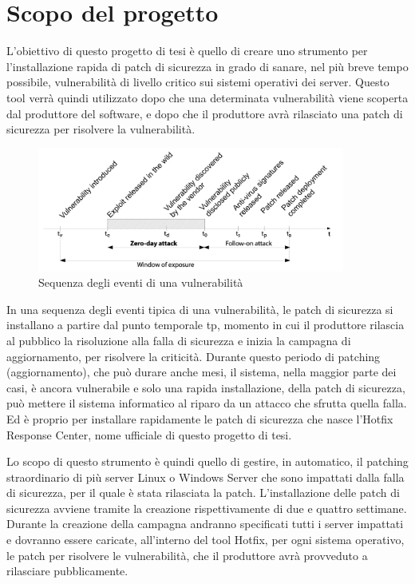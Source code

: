 %
%
\section{Scopo del progetto}
L'obiettivo di questo progetto di tesi è quello di creare uno strumento 
per l'installazione rapida di patch di sicurezza in grado di sanare, 
nel più breve tempo possibile, vulnerabilità di livello critico sui 
sistemi operativi dei server.
Questo tool verrà quindi utilizzato dopo che una determinata 
vulnerabilità viene scoperta dal produttore del software, e dopo che 
il produttore avrà rilasciato una patch di sicurezza per risolvere la 
vulnerabilità.
\begin{figure}[H]
  \begin{flushright}
    \centering
    \includegraphics[width=0.90\textwidth]{imgs/vulnerability_windows.png}
    \caption{Sequenza degli eventi di una vulnerabilità}
    \label{fig:Sequenza degli eventi di una vulnerabilità}
  \end{flushright}
\end{figure}
In una sequenza degli eventi tipica di una vulnerabilità, le patch di 
sicurezza si installano a partire dal punto temporale tp, momento in cui 
il produttore rilascia al pubblico la risoluzione alla falla di sicurezza 
e inizia la campagna di aggiornamento, per risolvere la criticità. 
Durante questo periodo di patching (aggiornamento), che può durare anche 
mesi, il sistema, nella maggior parte dei casi, è ancora vulnerabile e 
solo una rapida installazione, della patch di sicurezza, può mettere il 
sistema informatico al riparo da un attacco che sfrutta quella falla.
Ed è proprio per installare rapidamente le patch di sicurezza che nasce 
l’Hotfix Response Center, nome ufficiale di questo progetto di tesi.

Lo scopo di questo strumento è quindi quello di gestire, in automatico, 
il patching straordinario di più server Linux o Windows Server che sono 
impattati dalla falla di sicurezza, per il quale è stata rilasciata 
la patch.
L’installazione delle patch di sicurezza avviene tramite la creazione 
rispettivamente di due e quattro settimane. Durante la creazione della 
campagna andranno specificati tutti i server impattati e dovranno essere 
caricate, all’interno del tool Hotfix, per ogni sistema operativo, le 
patch per risolvere le vulnerabilità, che il produttore avrà provveduto 
a rilasciare pubblicamente.

